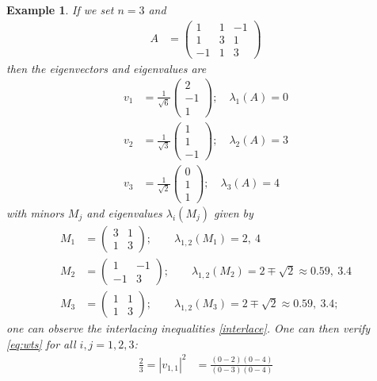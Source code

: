 \documentclass{amsart}
\newtheorem{example}[lemma]{Example}
\begin{document}
\begin{example} If we set $n=3$ and
\begin{align*}
A &= \begin{pmatrix}
1 & 1 & -1 \\
1 & 3 & 1\\
-1 & 1 &  3
\end{pmatrix}
\end{align*}
then the eigenvectors and eigenvalues are
\begin{align*}
 v_1&= \frac{1}{\sqrt{6}}\begin{pmatrix}
2  \\ -1\\ 1
\end{pmatrix} ; \quad \lambda_1(A)=0 \\ 
 v_2&= \frac{1}{\sqrt{3}}  \begin{pmatrix}
1  \\ 1\\ -1
\end{pmatrix}; \quad \lambda_2(A)=3 \\
 v_3&= \frac{1}{\sqrt{2}}  \begin{pmatrix}
0  \\ 1\\ 1
\end{pmatrix}; \quad \lambda_3(A)=4 
\end{align*}
with minors $M_j$ and eigenvalues $\lambda_i(M_j)$ given by
\begin{align*}
M_1 &= \begin{pmatrix}
3  & 1 \\
1  & 3
\end{pmatrix}; \quad \quad \lambda_{1,2}(M_1)=2, ~4 \\
M_2 &= \begin{pmatrix}
1  & -1 \\
 -1 & 3
\end{pmatrix};  \quad \quad \lambda_{1,2}(M_2)=2\mp \sqrt{2} \approx 0.59, ~3.4  \\
M_3 &= \begin{pmatrix}
1  & 1 \\
 1 & 3
\end{pmatrix}; \quad \quad \lambda_{1,2}(M_3)=2\mp \sqrt{2}   \approx 0.59, ~3.4;
\end{align*}
one can observe the interlacing inequalities \eqref{interlace}.  One can then verify \eqref{eq:wts} for all $i,j=1,2,3$:
\begin{align*}
\frac{2}{3} = |v_{1,1}|^2 &= \frac{(0-2)(0-4)}{(0-3)(0-4)}\\

\end{align*}
\end{example}
\end{document}
